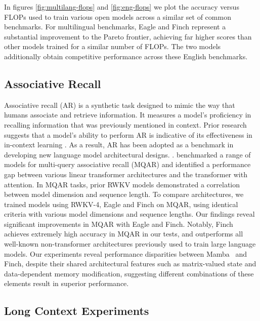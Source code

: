 In figures \ref{fig:multilang-flops} and \ref{fig:eng-flops} we plot the accuracy versus FLOPs used to train various open models across a similar set of common benchmarks. For multilingual benchmarks, Eagle and Finch represent a substantial improvement to the Pareto frontier, achieving far higher scores than other models trained for a similar number of FLOPs. The two models additionally obtain competitive performance across these English benchmarks.

\subsection{Associative Recall}
\label{subsec:associative_recall}

Associative recall (AR) is a synthetic task designed to mimic the way that humans associate and retrieve information. It measures a model's proficiency in recalling information that was previously mentioned in context. Prior research suggests that a model's ability to perform AR is indicative of its effectiveness in in-context learning \citep{elhage2021mathematical, olsson2022incontext}. As a result, AR has been adopted as a benchmark in developing new language model architectural designs. \citep{fu2023hungry, poli2023hyena, lutati2023focus}. \citet{arora2023zoology} benchmarked a range of models for multi-query associative recall (MQAR) and identified a performance gap between various linear transformer architectures and the transformer with attention. In MQAR tasks, prior RWKV models demonstrated a correlation between model dimension and sequence length. To compare architectures, we trained models using RWKV-4, Eagle and Finch on MQAR, using identical criteria with various model dimensions and sequence lengths. Our findings reveal significant improvements in MQAR with Eagle and Finch. Notably, Finch achieves extremely high accuracy in MQAR in our tests, and outperforms all well-known non-transformer architectures previously used to train large language models. Our experiments reveal performance disparities between Mamba~\citep{gu2023mamba} and Finch, despite their shared architectural features such as matrix-valued state and data-dependent memory modification, suggesting different combinations of these elements result in superior performance.

\subsection{Long Context Experiments}\label{subsec:long_context_experiments}

